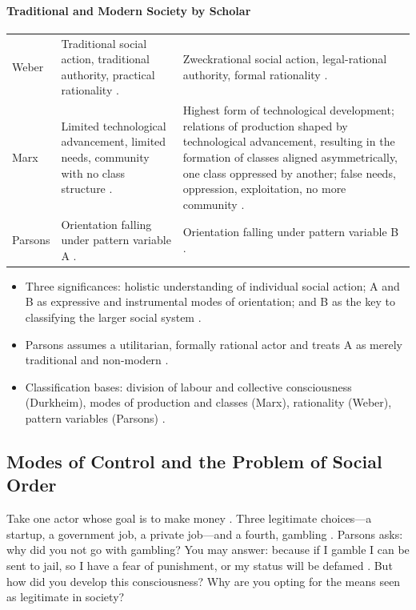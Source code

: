 \paragraph{Traditional and Modern Society by Scholar}
\vspace{6pt}
\noindent
\begin{tabularx}{\textwidth}{>{\hsize}Y >{\hsize}Y >{\hsize}Y}
\toprule
{}
 &  &  \\
\midrule
Weber & Traditional social action, traditional authority, practical rationality . & Zweckrational social action, legal-rational authority, formal rationality . \\
\midrule
Marx & Limited technological advancement, limited needs, community with no class structure . & Highest form of technological development; relations of production shaped by technological advancement, resulting in the formation of classes aligned asymmetrically, one class oppressed by another; false needs, oppression, exploitation, no more community . \\
\midrule
Parsons & Orientation falling under pattern variable A . & Orientation falling under pattern variable B . \\
\bottomrule
\end{tabularx}
\vspace{6pt}

\begin{QuickRevision}
\begin{itemize}
    \item Three significances: holistic understanding of individual social action; A and B as expressive and instrumental modes of orientation; and B as the key to classifying the larger social system .
    \item Parsons assumes a utilitarian, formally rational actor and treats A as merely traditional and non-modern .
    \item Classification bases: division of labour and collective consciousness (Durkheim), modes of production and classes (Marx), rationality (Weber), pattern variables (Parsons) .
\end{itemize}
\end{QuickRevision}

\subsection{Modes of Control and the Problem of Social Order}
Take one actor whose goal is to make money . Three legitimate choices---a startup, a government job, a private job---and a fourth, gambling . Parsons asks: why did you not go with gambling? 
You may answer: because if I gamble I can be sent to jail, so I have a fear of punishment, or my status will be defamed . But how did you develop this consciousness? Why are you opting for the means seen as legitimate in society? 

